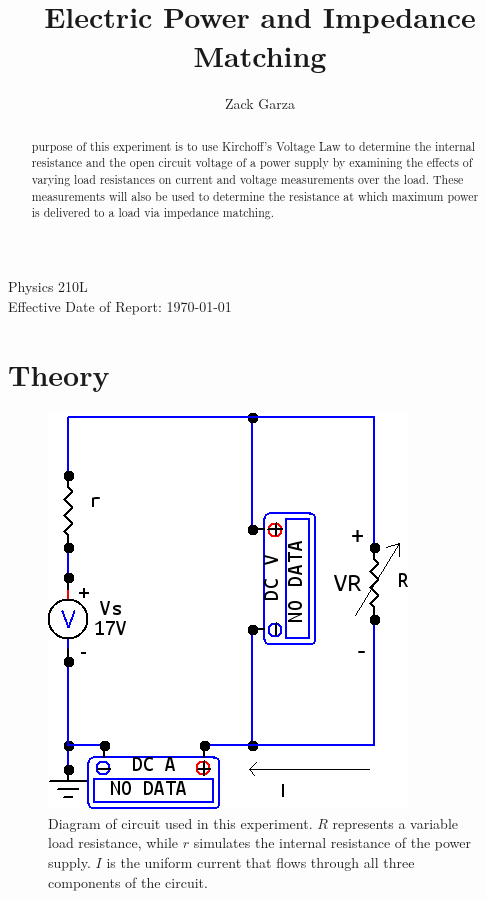 \documentclass[twocolumn,english]{IEEEtran}
\theoremstyle{plain}
\theoremstyle{plain}
\begin{document}
\title{Electric Power and Impedance Matching}


\author{Zack Garza}


\IEEEspecialpapernotice
{Physics 210L \\
Effective Date of Report: \today}


\maketitle
\begin{abstract}
 purpose of this experiment is to use Kirchoff's Voltage Law to determine the internal resistance and the open circuit voltage of a power supply by examining the effects of varying load resistances on current and voltage measurements over the load. These measurements will also be used to determine the resistance at which maximum power is delivered to a load via impedance matching.
\end{abstract}
\tableofcontents

\section{Theory}
\begin{figure}[h!]
  \begin{centering}
  \begin{center}
  \includegraphics[width=\linewidth]{./Images/circuit.png}
  \caption{Diagram of circuit used in this experiment. $R$ represents a variable load resistance, while $r$ simulates the internal resistance of the power supply. $I$ is the uniform current that flows through all three components of the circuit.}
  \label{fig:circuit_diagram}
  \end{center}
  \par\end{centering}
  \end{figure}
\end{document}
